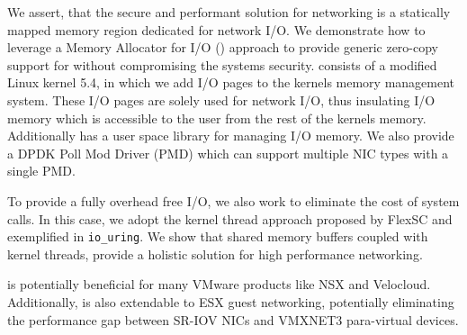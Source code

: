 We assert, that the secure and performant solution for networking is a statically mapped memory region dedicated for network I/O. We demonstrate how to leverage a Memory Allocator for I/O (\oursys) approach to provide generic zero-copy support for \sockets without compromising the systems security. 
\oursys consists of a modified Linux kernel 5.4, in which we add I/O pages to the kernels memory management system. These I/O pages are solely used for network I/O, thus insulating I/O memory which is accessible to the user from the rest of the kernels memory. Additionally \oursys has a user space library for managing I/O memory. We also provide a DPDK Poll Mod Driver (PMD) which can support multiple NIC types with a single \oursys PMD.

To provide a fully overhead free I/O, we also work to eliminate the cost of system calls. In this case, we adopt the kernel thread approach proposed by FlexSC\cite{flexsc} and exemplified in \texttt{io\_uring}\cite{io-uring}. We show that shared memory buffers coupled with kernel threads, provide a holistic solution for high performance networking.

\oursys is potentially beneficial for many VMware products like NSX and Velocloud. Additionally, \oursys is also extendable to ESX guest networking, potentially eliminating the performance gap between SR-IOV NICs and VMXNET3 para-virtual devices.